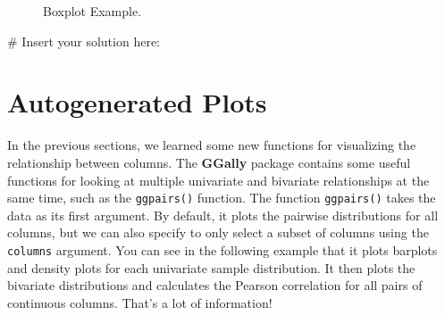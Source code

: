 \documentclass[
  letterpaper,
]{latex/krantz}
\makeatletter
\newenvironment{Shaded}{\begin{snugshade}}{\end{snugshade}}
\newcommand{\CommentTok}[1]{\textcolor[rgb]{0.37,0.37,0.37}{#1}}
\newenvironment{kframe}{%
\medskip{}
\setlength{\fboxsep}{.8em}
 \def\at@end@of@kframe{}%
 \ifinner\ifhmode%
  \def\at@end@of@kframe{\end{minipage}}%
  \begin{minipage}{\columnwidth}%
 \fi\fi%
 \def\FrameCommand##1{\hskip\@totalleftmargin \hskip-\fboxsep
 \colorbox{shadecolor}{##1}\hskip-\fboxsep
     \hskip-\linewidth \hskip-\@totalleftmargin \hskip\columnwidth}%
 \MakeFramed {\advance\hsize-\width
   \@totalleftmargin\z@ \linewidth\hsize
   \@setminipage}}%
 {\par\unskip\endMakeFramed%
 \at@end@of@kframe}
\renewenvironment{Shaded}{\begin{kframe}}{\end{kframe}}
\makeatother
\begin{document}
\begin{figure}


\caption{\label{fig-box-plot}Boxplot Example.}

\end{figure}%

\begin{Shaded}
\begin{Highlighting}[]
\CommentTok{\# Insert your solution here:}
\end{Highlighting}
\end{Shaded}

\section{\texorpdfstring{Autogenerated Plots
}{Autogenerated Plots }}\label{autogenerated-plots}

In the previous sections, we learned some new functions for visualizing
the relationship between columns. The
\textbf{GGally} package contains some useful
functions for looking at multiple univariate and bivariate relationships
at the same time, such as the
\texttt{ggpairs()}
function. The function \texttt{ggpairs()} takes the data as its first
argument. By default, it plots the pairwise distributions for all
columns, but we can also specify to only select a subset of columns
using the \texttt{columns} argument. You can see in the following
example that it plots barplots and density plots for each univariate
sample distribution. It then plots the bivariate distributions and
calculates the Pearson correlation for all pairs of continuous columns.
That's a lot of information!
\end{document}
